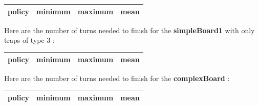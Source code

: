 \documentclass{eplDoc}
\begin{document}
\begin{center}
		\begin{tabular}{|r|ccc|}
			\hline
			policy & minimum & maximum & mean \\ 
			\hline
            
   		\hline
		\end{tabular}
\end{center}
Here are the number of turns needed to finish for the \textbf{simpleBoard1} with only traps of type 3 : 

\begin{center}
		\begin{tabular}{|r|ccc|}
			\hline
			policy & minimum & maximum & mean \\ 
			\hline
            
   		\hline
		\end{tabular}
\end{center}

Here are the number of turns needed to finish for the \textbf{complexBoard} : 

\begin{center}
		\begin{tabular}{|r|ccc|}
			\hline
			policy & minimum & maximum & mean \\ 
			\hline
            
   		\hline
		\end{tabular}
\end{center}
\end{document}
